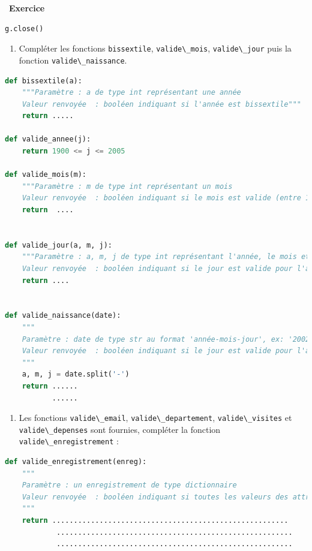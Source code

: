 \documentclass[
  11pt,
]{article}
\newcommand{\passthrough}[1]{#1}
\providecommand{\tightlist}{%
  \setlength{\itemsep}{0pt}\setlength{\parskip}{0pt}}
\newcounter{exo}
\newenvironment{exercice}[1]
{\par \medskip   \addtocounter{exo}{1} \noindent  
\begin{bclogo}[arrondi =0.1,   noborder = true, logo=\bccrayon, marge=4]{~\textbf{Exercice} \textbf{\theexo} {\itshape #1} }  \par}
{
\end{bclogo}
 \par \bigskip }
\newcounter{def}
\begin{document}
\begin{exercice}{}
\begin{lstlisting}[language=Python]
    g.close()
\end{lstlisting}

\begin{enumerate}
\def\labelenumi{\arabic{enumi}.}
\setcounter{enumi}{1}
\tightlist
\item
  Compléter les fonctions \passthrough{\lstinline!bissextile!},
  \passthrough{\lstinline!valide\_mois!},
  \passthrough{\lstinline!valide\_jour!} puis la fonction
  \passthrough{\lstinline!valide\_naissance!}.
\end{enumerate}

\begin{lstlisting}[language=Python]
def bissextile(a):
    """Paramètre : a de type int représentant une année
    Valeur renvoyée  : booléen indiquant si l'année est bissextile"""
    return .....

def valide_annee(j):
    return 1900 <= j <= 2005

def valide_mois(m):
    """Paramètre : m de type int représentant un mois
    Valeur renvoyée  : booléen indiquant si le mois est valide (entre 1 et 12)"""
    return  ....
    

def valide_jour(a, m, j):
    """Paramètre : a, m, j de type int représentant l'année, le mois et le jour
    Valeur renvoyée  : booléen indiquant si le jour est valide pour l'année et le mois donnés"""
    return ....
   

def valide_naissance(date):
    """
    Paramètre : date de type str au format 'année-mois-jour', ex: '2002-01-07'
    Valeur renvoyée  : booléen indiquant si le jour est valide pour l'année et le mois donnés
    """
    a, m, j = date.split('-')
    return ......
           ......
\end{lstlisting}

\begin{enumerate}
\def\labelenumi{\arabic{enumi}.}
\setcounter{enumi}{2}
\tightlist
\item
  Les fonctions \passthrough{\lstinline!valide\_email!},
  \passthrough{\lstinline!valide\_departement!},
  \passthrough{\lstinline!valide\_visites!} et
  \passthrough{\lstinline!valide\_depenses!} sont fournies, compléter la
  fonction \passthrough{\lstinline!valide\_enregistrement!} :
\end{enumerate}

\begin{lstlisting}[language=Python]
def valide_enregistrement(enreg):
    """
    Paramètre : un enregistrement de type dictionnaire
    Valeur renvoyée  : booléen indiquant si toutes les valeurs des attributs sont valides
    """
    return .......................................................
            .......................................................
            .......................................................
\end{lstlisting}


\end{exercice}
\end{document}
